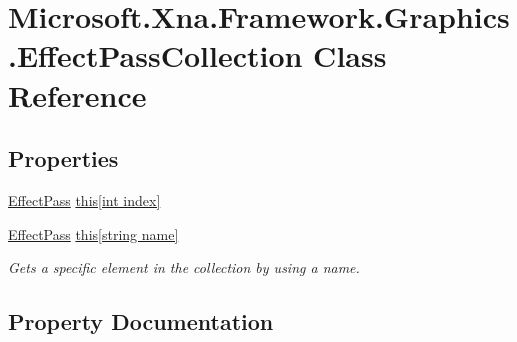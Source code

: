 \hypertarget{class_microsoft_1_1_xna_1_1_framework_1_1_graphics_1_1_effect_pass_collection}{}\section{Microsoft.\+Xna.\+Framework.\+Graphics.\+Effect\+Pass\+Collection Class Reference}
\label{class_microsoft_1_1_xna_1_1_framework_1_1_graphics_1_1_effect_pass_collection}
\subsection*{Properties}
\begin{DoxyCompactItemize}
\item 
\hyperlink{class_microsoft_1_1_xna_1_1_framework_1_1_graphics_1_1_effect_pass}{Effect\+Pass} \hyperlink{class_microsoft_1_1_xna_1_1_framework_1_1_graphics_1_1_effect_pass_collection_aaed4571c31d4062f6ed8a8fa404f9da4}{this\mbox{[}int index\mbox{]}}
\item 
\hyperlink{class_microsoft_1_1_xna_1_1_framework_1_1_graphics_1_1_effect_pass}{Effect\+Pass} \hyperlink{class_microsoft_1_1_xna_1_1_framework_1_1_graphics_1_1_effect_pass_collection_aee72b784b3f2b28fb748c271ee86b49b}{this\mbox{[}string name\mbox{]}}
\begin{DoxyCompactList}\small\item\em Gets a specific element in the collection by using a name.\end{DoxyCompactList}\end{DoxyCompactItemize}


\subsection{Property Documentation}
\hypertarget{class_microsoft_1_1_xna_1_1_framework_1_1_graphics_1_1_effect_pass_collection_aaed4571c31d4062f6ed8a8fa404f9da4}{}
